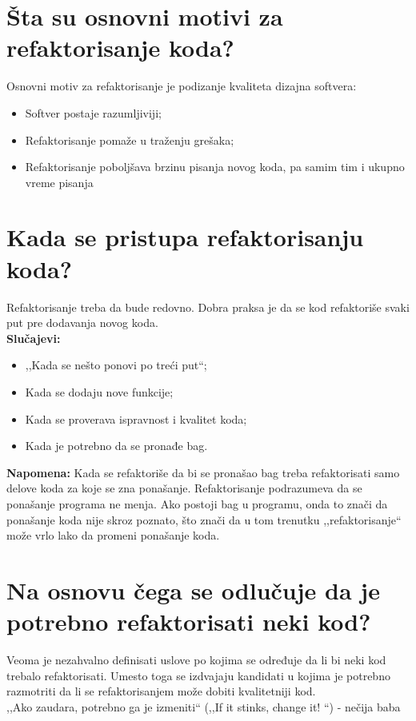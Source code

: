\documentclass[a4paper]{article}
\begin{document}
\section{Šta su osnovni motivi za refaktorisanje koda?}
  \noindent Osnovni motiv za refaktorisanje je podizanje kvaliteta dizajna softvera:
  \begin{itemize}
    \item Softver postaje razumljiviji;
    \item Refaktorisanje pomaže u traženju grešaka;
    \item Refaktorisanje poboljšava brzinu pisanja novog koda, pa samim tim i ukupno vreme pisanja
  \end{itemize}

\section{Kada se pristupa refaktorisanju koda?}
  Refaktorisanje treba da bude redovno. Dobra praksa je da se kod refaktoriše svaki put pre
  dodavanja novog koda. \\
  \textbf{Slučajevi:}
  \begin{itemize}
    \item ,,Kada se nešto ponovi po treći put``;
    \item Kada se dodaju nove funkcije;
    \item Kada se proverava ispravnost i kvalitet koda;
    \item Kada je potrebno da se pronađe bag. 
  \end{itemize}
  \textbf{Napomena:} Kada se refaktoriše da bi se pronašao bag treba refaktorisati samo delove koda
  za koje se zna ponašanje. Refaktorisanje podrazumeva da se ponašanje programa ne menja.
  Ako postoji bag u programu, onda to znači da ponašanje koda nije skroz poznato, što 
  znači da u tom trenutku ,,refaktorisanje`` može vrlo lako da promeni ponašanje koda.

\section{Na osnovu čega se odlučuje da je potrebno refaktorisati neki kod?}
  Veoma je nezahvalno definisati uslove po kojima se određuje da li bi neki kod trebalo refaktorisati.
  Umesto toga se izdvajaju kandidati u kojima je potrebno razmotriti da li se refaktorisanjem
  može dobiti kvalitetniji kod. \\

  ,,Ako zaudara, potrebno ga je izmeniti`` (,,If it stinks, change it! ``) - nečija baba \\
\end{document}
